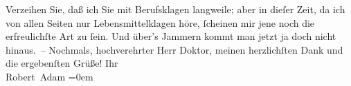 \begin{ledgroupsized}[t]{13cm}
           \pstart
           Verzeihen Sie, daß ich Sie mit Berufsklagen langweile; aber in dieſer Zeit, da ich
               von allen Seiten nur Lebensmittelklagen höre, ſcheinen mir jene noch die
               erfreulichſte Art zu ſein. Und über’s Jammern kommt man jetzt ja doch nicht
               hinaus. –\pend
           \pstart
           Nochmals, hochverehrter Herr Doktor, meinen herzlichſten Dank und die ergebenſten
               Grüße!\pend
           \pstart
           Ihr{\\[\baselineskip]}\spacefill\mbox{Robert Adam}\pend
           \leftskip=0em{}
         
         \endnumbering{}\end{ledgroupsized}  \newcommand{\dateiname}{L02268}\newcommand{\titel}{Robert Adam an Arthur Schnitzler, 23. 8. 1917}\newcommand{\editorInnen}{Martin Anton Müller und Gerd-Hermann Susen}
      